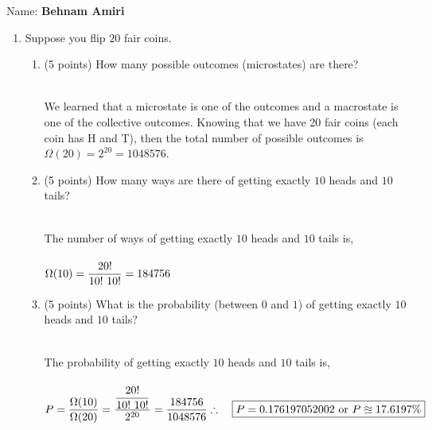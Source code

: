 \documentclass[fleqn]{article}
\begin{document}
  Name: \textbf{Behnam Amiri}

  \vspace{1cm}

  \begin{enumerate}
    \item Suppose you flip $20$ fair coins.
      \begin{enumerate}
        \item (5 points) How many possible outcomes (microstates) are there?

          \textcolor{hwColor}{
            \\
            We learned that a microstate is one of the outcomes and a macrostate is one of the 
            collective outcomes. Knowing that we have 20 fair coins (each coin has H and T),
            then the total number of possible outcomes is $\Omega(20)=2^{20}=1048576$.
            \\
          }

        \item (5 points) How many ways are there of getting exactly $10$ heads and $10$ tails?

          \textcolor{hwColor}{
            \\
            The number of ways of getting exactly $10$ heads and $10$ tails is,
            \\
            \\
             $
              \Omega(10)=\dfrac{20!}{10! ~ 10!}=184756
              \\
             $
          }

        \item (5 points) What is the probability (between $0$ and $1$) of getting exactly $10$ heads and $10$
        tails?

          \textcolor{hwColor}{
            \\
            The probability of getting exactly $10$ heads and $10$ tails is,
            \\
            \\
            $
              P=\dfrac{
                \Omega(10)
              }{
                \Omega(20)
              }=\dfrac{
                \dfrac{20!}{10! ~ 10!}
              }{
                2^{20}
              }=\dfrac{184756}{1048576}
              \\
              \\
              \\
              \therefore ~~~ \boxed{
                P=0.176197052002 ~ \text{or} ~ P \approxeq 17.6197\%
              }
              \\
            $
          }


\end{enumerate}
\end{enumerate}
\end{document}
